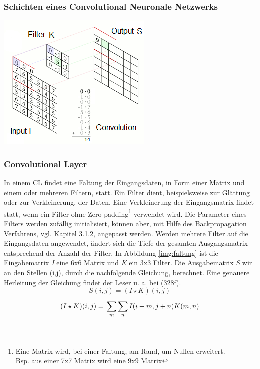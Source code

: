 \documentclass[twosided,a4,10pt]{article}
\begin{document}
\begin{multicols}{2}
		\subsubsection{Schichten eines Convolutional Neuronale Netzwerks}
		\begin{minipage}{0.45\textwidth}
			\centering
			\includegraphics{img/faltung2.png}
			\label{img:faltung}
		\end{minipage}\newline
		\subsubsection*{Convolutional Layer}
		In einem CL findet eine Faltung der Eingangsdaten, in Form einer Matrix und einem oder mehreren Filtern, statt. Ein Filter dient, beispielsweise zur Glättung oder zur Verkleinerung, der Daten. Eine Verkleinerung der Eingangsmatrix findet statt, wenn ein Filter ohne Zero-padding\footnote[12]{Eine Matrix wird, bei einer Faltung, am Rand, um Nullen erweitert.\\ Bsp. aus einer 7x7 Matrix wird eine 9x9 Matrix} verwendet wird. Die Parameter eines Filters werden zufällig initialisiert, können aber, mit Hilfe des Backpropagation Verfahrens, vgl. Kapitel 3.1.2, angepasst werden. Werden mehrere Filter auf die Eingangsdaten angewendet, ändert sich die Tiefe der gesamten Ausgangsmatrix entsprechend der Anzahl der Filter. \cite{karpathy}\newline
		In Abbildung \ref{img:faltung} ist die Eingabematrix \textit{I} eine 6x6 Matrix und \textit{K} ein 3x3 Filter. Die Ausgabematrix \textit{S} wir an den Stellen (i,j), durch die nachfolgende Gleichung, berechnet. Eine genauere Herleitung der Gleichung findet der Leser u. a. bei \cite{goodfellow}(328f).\newline\\	
		\begin{equation*}
		S(i,j) =(I \star K)(i,j)
		\end{equation*}
		\begin{equation*}
		(I \star K)(i,j) =\newline\sum_{m}^{}\sum_{n}^{}I(i+m,j+n)K(m,n)
		\end{equation*}\newline\\

\end{multicols}
\end{document}

